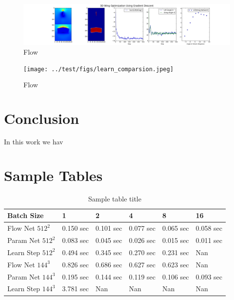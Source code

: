 \documentclass{article} %
\begin{document}
\begin{figure}[h]
\begin{center}
\includegraphics[scale=0.34]{../test/figs/learn_gradient_descent.jpeg}
\end{center}
\caption{Flow}
\end{figure}

\begin{figure}[h]
\begin{center}
\texttt{[image: ../test/figs/learn\_comparsion.jpeg]}
\end{center}
\caption{Flow}
\end{figure}





\section{Conclusion}

In this work we hav


\section{Sample Tables}

\begin{table}[t]
\caption{Sample table title}
\label{sample-table}
\begin{center}
\begin{tabular}{l|lllll}
Batch Size & 1 & 2 & 4 & 8 & 16 \\ \hline 
Flow Net $512^2$ & 0.150 sec & 0.101 sec & 0.077 sec & 0.065 sec & 0.058 sec \\ 
Param Net $512^2$ & 0.083 sec & 0.045 sec & 0.026 sec & 0.015 sec & 0.011 sec \\ 
Learn Step $512^2$ & 0.494 sec & 0.345 sec & 0.270 sec & 0.231 sec & Nan \\ 
Flow Net $144^3$ & 0.826 sec & 0.686 sec & 0.627 sec & 0.623 sec & Nan \\ 
Param Net $144^3$ & 0.195 sec & 0.144 sec & 0.119 sec & 0.106 sec & 0.093 sec \\ 
Learn Step $144^3$ & 3.781 sec & Nan & Nan & Nan & Nan \\ 
\end{tabular}
\end{center}
\end{table}
\end{document}
